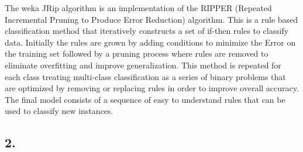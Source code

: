 \documentclass{article}
\begin{document}
\begin{enumerate}[label = (\alph*), left=10pt, itemsep=10pt]
\begin{minipage}[t]{0.9\textwidth}
\begin{figure}[H]
            \end{figure}
            The weka JRip algorithm is an implementation of the RIPPER (Repeated Incremental Pruning to Produce
            Error Reduction) algorithm. This is a rule based classification method that iteratively constructs a set
            of if-then rules to classify data. Initially the rules are grown by adding conditions to minimize the Error
            on the training set followed by a pruning process where rules are removed to eliminate overfitting and improve
            generalization. This method is repeated for each class treating multi-class classification as a series of
            binary problems that are optimized by removing or replacing rules in order to improve overall accuracy.
            The final model consists of a sequence of easy to understand rules that can be used to classify new instances.
        \end{minipage}

    \end{enumerate}

    \subsection*{2.}
    
\end{document}
